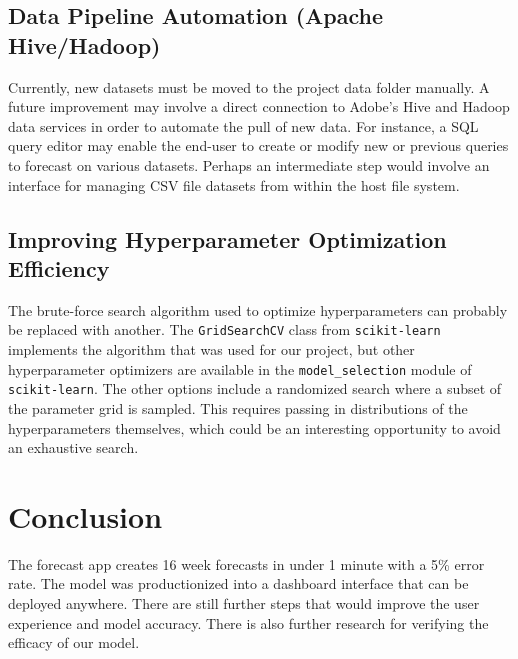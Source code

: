 \documentclass[11pt, oneside]{article}
\begin{document}
\subsection{Data Pipeline Automation (Apache Hive/Hadoop)}
Currently, new datasets must be moved to the project data folder manually. A future improvement may involve a direct connection to Adobe's Hive and Hadoop data services in order to automate the pull of new data. For instance, a SQL query editor may enable the end-user to create or modify new or previous queries to forecast on various datasets. Perhaps an intermediate step would involve an interface for managing CSV file datasets from within the host file system.

\subsection{Improving Hyperparameter Optimization Efficiency}
\label{improving_hyperparameter_optimization_efficiency}
The brute-force search algorithm used to optimize hyperparameters can probably be replaced with another. The \texttt{GridSearchCV} class from \texttt{scikit-learn} implements the algorithm that was used for our project, but other hyperparameter optimizers are available in the \texttt{model\_selection} module of \texttt{scikit-learn}. The other options include a randomized search where a subset of the parameter grid is sampled. This requires passing in distributions of the hyperparameters themselves, which could be an interesting opportunity to avoid an exhaustive search.

\section{Conclusion}
The forecast app creates 16 week forecasts in under 1 minute with a 5\% error rate. The model was productionized into a dashboard interface that can be deployed anywhere. There are still further steps that would improve the user experience and model accuracy. There is also further research for verifying the efficacy of our model.

\newpage


\end{document}

